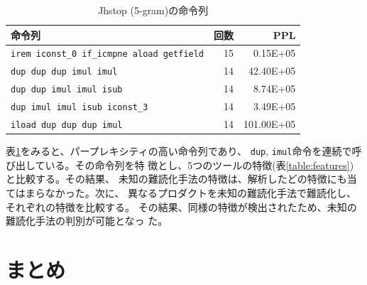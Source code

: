 \documentclass[a4j,fleqn,10pt]{jarticle}
\begin{document}
\begin{table}[t]
  \centering
  \footnotesize{
    \caption{Jhstop (5-gram)の命令列}\label{table:jhstop}
  \begin{tabular}{l|r|r}
    命令列 &
    回数 & 
    PPL \\ \hline
    \texttt{irem iconst\_0 if\_icmpne aload getfield} & 15 &   0.15E+05 \\
    \texttt{dup dup dup imul imul}                    & 14 &  42.40E+05 \\
    \texttt{dup dup imul imul isub}                   & 14 &   8.74E+05 \\
    \texttt{dup imul imul isub iconst\_3}             & 14 &   3.49E+05 \\
    \texttt{iload dup dup dup imul}                   & 14 & 101.00E+05 \\
    \end{tabular}}
\end{table}

表\ref{table:jhstop}をみると、パープレキシティの高い命令列であり、
\texttt{dup}, \texttt{imul}命令を連続で呼び出している。その命令列を特
徴とし、5つのツールの特徴(表\ref{table:features})と比較する。その結果、
未知の難読化手法の特徴は、解析したどの特徴にも当てはまらなかった。次に、
異なるプロダクトを未知の難読化手法で難読化し、それぞれの特徴を比較する。
その結果、同様の特徴が検出されたため、未知の難読化手法の判別が可能となっ
た。
 
\section{まとめ}
\end{document}
